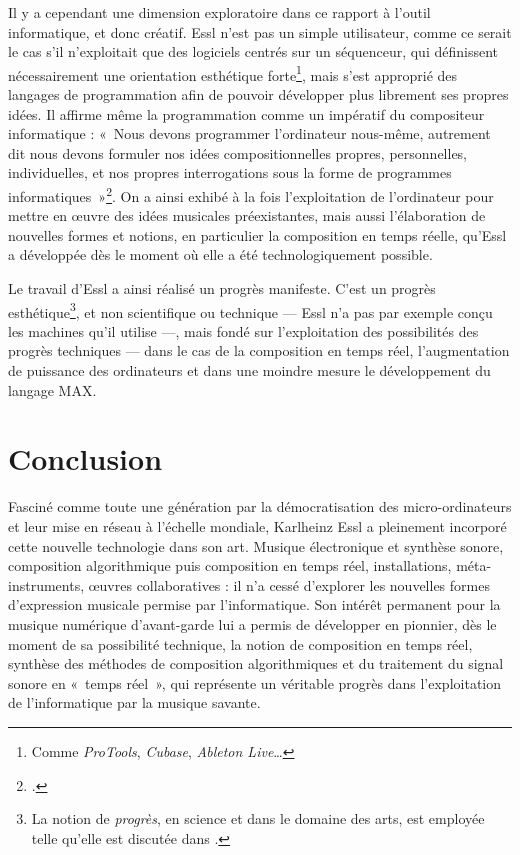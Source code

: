 \documentclass[a4paper,12pt]{article}
\newcommand{\guill}[1]{«~#1~»}
\newcommand{\zitat}[2]{\#Citation(#2)\#}
\begin{document}
Il y a cependant une dimension exploratoire dans ce rapport à l'outil informatique, et donc créatif. Essl n'est pas un simple utilisateur, comme ce serait le cas s'il n'exploitait que des logiciels centrés sur un séquenceur, qui définissent nécessairement une orientation esthétique forte\footnote{Comme \emph{ProTools}, \emph{Cubase}, \emph{Ableton Live}\dots}, mais s'est approprié des langages de programmation afin de pouvoir développer plus librement ses propres idées. Il affirme même la programmation comme un impératif du compositeur informatique : \guill{Nous devons programmer l'ordinateur nous-même, autrement dit nous devons formuler nos idées compositionnelles propres, personnelles, individuelles, et nos propres interrogations sous la forme de programmes informatiques}\footnote{\cite{intuitionautomation}.}. On a ainsi exhibé à la fois l'exploitation de l'ordinateur pour mettre en œuvre des idées musicales préexistantes, mais aussi l'élaboration de nouvelles formes et notions, en particulier la composition en temps réelle, qu'Essl a développée dès le moment où elle a été technologiquement possible.

Le travail d'Essl a ainsi réalisé un progrès manifeste. C'est un progrès esthétique\footnote{La notion de \emph{progrès}, en science et dans le domaine des arts, est employée telle qu'elle est discutée dans \cite{kuhn2012structure}.}, et non scientifique ou technique --- Essl n'a pas par exemple conçu les machines qu'il utilise ---, mais fondé sur l'exploitation des possibilités des progrès techniques --- dans le cas de la composition en temps réel, l'augmentation de puissance des ordinateurs et dans une moindre mesure le développement du langage MAX.



\section{Conclusion}

Fasciné comme toute une génération par la démocratisation des micro-ordinateurs et leur mise en réseau à l'échelle mondiale, Karlheinz Essl a pleinement incorporé cette nouvelle technologie dans son art. Musique électronique et synthèse sonore, composition algorithmique puis composition en temps réel, installations, méta-instruments, œuvres collaboratives : il n'a cessé d'explorer les nouvelles formes d'expression musicale permise par l'informatique. Son intérêt permanent pour la musique numérique d'avant-garde lui a permis de développer en pionnier, dès le moment de sa possibilité technique, la notion de composition en temps réel, synthèse des méthodes de composition algorithmiques et du traitement du signal sonore en \guill{temps réel}, qui représente un véritable progrès dans l'exploitation de l'informatique par la musique savante.
\end{document}
